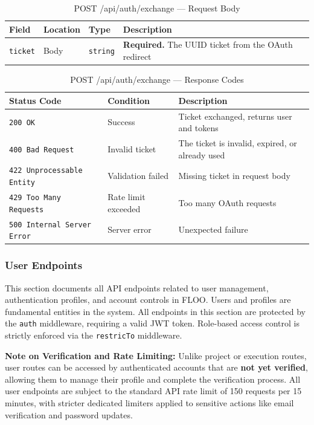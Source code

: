 \begin{table}[H]
\centering
\renewcommand{\arraystretch}{1.3}
\begin{tabularx}{\textwidth}{|l|l|l|X|}
\hline
\textbf{Field} & \textbf{Location} & \textbf{Type} & \textbf{Description} \\
\hline
\texttt{ticket} & Body & \texttt{string} & \textbf{Required.} The UUID ticket from the OAuth redirect \\
\hline
\end{tabularx}
\caption{POST /api/auth/exchange — Request Body}
\label{tab:exchange-ticket-body}
\end{table}

\begin{table}[H]
\centering
\renewcommand{\arraystretch}{1.3}
\begin{tabularx}{\textwidth}{|l|l|X|}
\hline
\textbf{Status Code} & \textbf{Condition} & \textbf{Description} \\
\hline
\texttt{200 OK}           & Success              & Ticket exchanged, returns user and tokens \\
\hline
\texttt{400 Bad Request}  & Invalid ticket       & The ticket is invalid, expired, or already used \\
\hline
\texttt{422 Unprocessable Entity} & Validation failed & Missing ticket in request body \\
\hline
\texttt{429 Too Many Requests} & Rate limit exceeded & Too many OAuth requests \\
\hline
\texttt{500 Internal Server Error} & Server error & Unexpected failure \\
\hline
\end{tabularx}
\caption{POST /api/auth/exchange — Response Codes}
\label{tab:exchange-ticket-responses}
\end{table}
\FloatBarrier
\subsubsection{User Endpoints}
\label{subsec:user-endpoints}

This section documents all API endpoints related to user management, authentication profiles, and account controls in FLOO. Users and profiles are fundamental entities in the system. All endpoints in this section are protected by the \texttt{auth} middleware, requiring a valid JWT token. Role-based access control is strictly enforced via the \texttt{restricTo} middleware.

\textbf{Note on Verification and Rate Limiting:} Unlike project or execution routes, user routes can be accessed by authenticated accounts that are \textbf{not yet verified}, allowing them to manage their profile and complete the verification process. All user endpoints are subject to the standard API rate limit of 150 requests per 15 minutes, with stricter dedicated limiters applied to sensitive actions like email verification and password updates.


